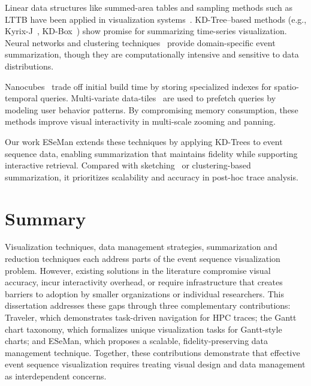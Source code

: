 \begin{refsection}
Linear data structures like summed-area tables and sampling methods such as LTTB have been applied in visualization systems~\cite{van2022plotly,sakin2022traveler}. KD-Tree–based methods (e.g., Kyrix-J~\cite{tao2020kyrix}, KD-Box~\cite{zhao2021kd}) show promise for summarizing time-series visualization. Neural networks and clustering techniques~\cite{jo2014livegantt,nesi2023summarizing,pasupathi2021trend} provide domain-specific event summarization, though they are computationally intensive and sensitive to data distributions.

Nanocubes~\cite{lins2013nanocubes} trade off initial build time by storing specialized indexes for spatio-temporal queries. Multi-variate data-tiles~\cite{moritz2019falcon} are used to prefetch queries by modeling user behavior patterns. By compromising memory consumption, these methods improve visual interactivity in multi-scale zooming and panning.

\begin{sloppypar}
Our work ESeMan extends these techniques by applying KD-Trees to event sequence data, enabling summarization that maintains fidelity while supporting interactive retrieval. Compared with sketching~\cite{cormode2017data,budiu2015interacting} or clustering-based summarization, it prioritizes scalability and accuracy in post-hoc trace analysis.
\end{sloppypar}

\section{Summary}
Visualization techniques, data management strategies, summarization and reduction techniques each address parts of the event sequence visualization problem. However, existing solutions in the literature compromise visual accuracy, incur interactivity overhead, or require infrastructure that creates barriers to adoption by smaller organizations or individual researchers. This dissertation addresses these gaps through three complementary contributions: Traveler, which demonstrates task-driven navigation for HPC traces; the Gantt chart taxonomy, which formalizes unique visualization tasks for Gantt-style charts; and ESeMan, which proposes a scalable, fidelity-preserving data management technique. Together, these contributions demonstrate that effective event sequence visualization requires treating visual design and data management as interdependent concerns.

\printbibliography[heading=subbibnumbered]
\end{refsection}